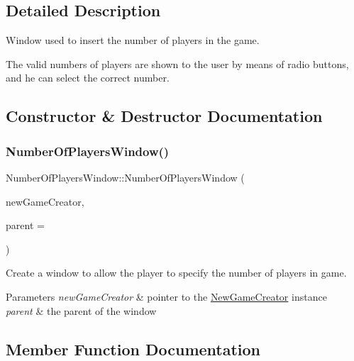 \subsection{Detailed Description}
Window used to insert the number of players in the game. 

The valid numbers of players are shown to the user by means of radio buttons, and he can select the correct number. 

\subsection{Constructor \& Destructor Documentation}
\mbox{\label{classNumberOfPlayersWindow_a522ce7de553a78ef1514cc988abb8d38}} 
\subsubsection{\texorpdfstring{Number\+Of\+Players\+Window()}{NumberOfPlayersWindow()}}
{\footnotesize\ttfamily Number\+Of\+Players\+Window\+::\+Number\+Of\+Players\+Window (\begin{DoxyParamCaption}\item[{\hyperlink{classNewGameCreator}{New\+Game\+Creator} $\ast$}]{new\+Game\+Creator,  }\item[{Q\+Widget $\ast$}]{parent = {} }\end{DoxyParamCaption})\hspace{0.3cm}{\ttfamily [explicit]}}



Create a window to allow the player to specify the number of players in game. 


\begin{DoxyParams}{Parameters}
{\em new\+Game\+Creator} & pointer to the \hyperlink{classNewGameCreator}{New\+Game\+Creator} instance \\
\hline
{\em parent} & the parent of the window \\
\hline
\end{DoxyParams}


\subsection{Member Function Documentation}
\mbox{\label{classNumberOfPlayersWindow_afefa90be1b7ddf10ac84744a7b79816d}} 
